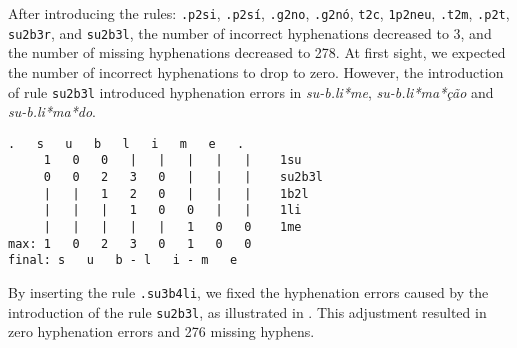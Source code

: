 %
% 
%


After introducing the rules: \texttt{.p2si}, \texttt{.p2sí}, \texttt{.g2no}, \texttt{.g2nó}, \texttt{t2c}, 
\texttt{1p2neu}, \texttt{.t2m}, \texttt{.p2t}, \texttt{su2b3r}, and \texttt{su2b3l}, 
the number of incorrect hyphenations decreased to 3, and the number of missing hyphenations decreased to 278.
At first sight, we expected the number of incorrect hyphenations to drop to zero. However, 
the introduction of rule \texttt{su2b3l} introduced hyphenation errors in \emph{su-b.li*me}, \emph{su-b.li*ma*ção} and \emph{su-b.li*ma*do}.

\noindent\begin{minipage}{\linewidth}
\begin{lstlisting}[language={}, caption={Hyphenation of the word \emph{sublime} after the indroduction of rule \texttt{su2b3l}. 
This rule introduces a wrong hyphenation point, demanding an exception rule to fix it.}, label=sublimehyphenation]
   .   s   u   b   l   i   m   e   .
     1   0   0   |   |   |   |   |    1su
     0   0   2   3   0   |   |   |    su2b3l
     |   |   1   2   0   |   |   |    1b2l
     |   |   |   1   0   0   |   |    1li
     |   |   |   |   |   1   0   0    1me
max: 1   0   2   3   0   1   0   0
final: s   u   b - l   i - m   e
\end{lstlisting}
\end{minipage}
\noindent{}By inserting the rule \texttt{.su3b4li}, we fixed the hyphenation errors caused by the introduction of the rule \texttt{su2b3l},
as illustrated in . This adjustment resulted in zero hyphenation errors and 276 missing hyphens.

